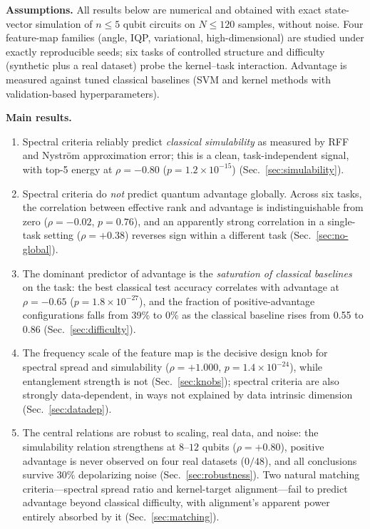 \documentclass[aps,pra,preprint]{revtex4-2}
\begin{document}
\textbf{Assumptions.} All results below are numerical and obtained with exact
state-vector simulation of $n\le5$ qubit circuits on $N\le120$ samples, without noise.
Four feature-map families (angle, IQP, variational, high-dimensional) are studied under
exactly reproducible seeds; six tasks of controlled structure and difficulty
(synthetic plus a real dataset) probe the kernel--task interaction. Advantage is
measured against tuned classical baselines (SVM and kernel methods with validation-based
hyperparameters).

\textbf{Main results.}
\begin{enumerate}
\item Spectral criteria reliably predict \emph{classical simulability} as measured by
RFF and Nystr\"om approximation error; this is a clean, task-independent signal, with
top-5 energy at $\rho=-0.80$ ($p=1.2\times10^{-15}$) (Sec.~\ref{sec:simulability}).
\item Spectral criteria do \emph{not} predict quantum advantage globally. Across six
tasks, the correlation between effective rank and advantage is indistinguishable from
zero ($\rho=-0.02$, $p=0.76$), and an apparently strong correlation in a single-task
setting ($\rho=+0.38$) reverses sign within a different task (Sec.~\ref{sec:no-global}).
\item The dominant predictor of advantage is the \emph{saturation of classical
baselines} on the task: the best classical test accuracy correlates with advantage at
$\rho=-0.65$ ($p=1.8\times10^{-27}$), and the fraction of positive-advantage
configurations falls from 39\% to 0\% as the classical baseline rises from 0.55 to
0.86 (Sec.~\ref{sec:difficulty}).
\item The frequency scale of the feature map is the decisive design knob for spectral
spread and simulability ($\rho=+1.000$, $p=1.4\times10^{-24}$), while entanglement
strength is not (Sec.~\ref{sec:knobs}); spectral criteria are also strongly
data-dependent, in ways not explained by data intrinsic dimension
(Sec.~\ref{sec:datadep}).
\item The central relations are robust to scaling, real data, and noise: the
simulability relation strengthens at $8$--$12$ qubits ($\rho=+0.80$), positive advantage
is never observed on four real datasets ($0/48$), and all conclusions survive $30\%$
depolarizing noise (Sec.~\ref{sec:robustness}). Two natural matching criteria---spectral
spread ratio and kernel-target alignment---fail to predict advantage beyond classical
difficulty, with alignment's apparent power entirely absorbed by it
(Sec.~\ref{sec:matching}).
\end{enumerate}
\end{document}
